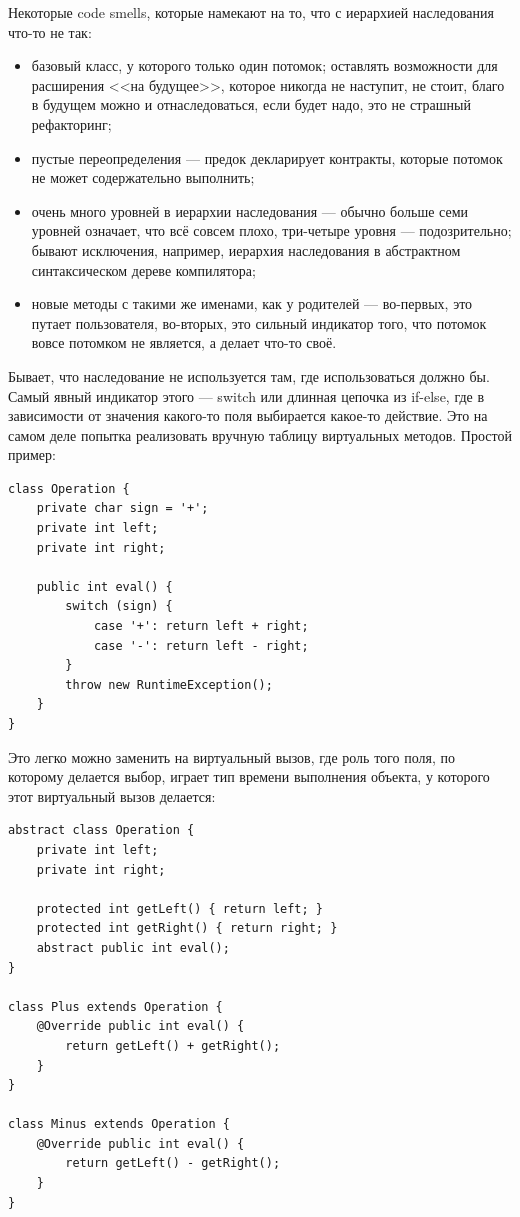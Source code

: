 \documentclass[a5paper]{article}
\begin{document}
Некоторые code smells, которые намекают на то, что с иерархией наследования что-то не так:

\begin{itemize}
    \item базовый класс, у которого только один потомок; оставлять возможности для расширения <<на будущее>>, которое никогда не наступит, не стоит, благо в будущем можно и отнаследоваться, если будет надо, это не страшный рефакторинг;
    \item пустые переопределения --- предок декларирует контракты, которые потомок не может содержательно выполнить;
    \item очень много уровней в иерархии наследования --- обычно больше семи уровней означает, что всё совсем плохо, три-четыре уровня --- подозрительно; бывают исключения, например, иерархия наследования в абстрактном синтаксическом дереве компилятора;
    \item новые методы с такими же именами, как у родителей --- во-первых, это путает пользователя, во-вторых, это сильный индикатор того, что потомок вовсе потомком не является, а делает что-то своё.
\end{itemize}

Бывает, что наследование не используется там, где использоваться должно бы. Самый явный индикатор этого --- switch или длинная цепочка из if-else, где в зависимости от значения какого-то поля выбирается какое-то действие. Это на самом деле попытка реализовать вручную таблицу виртуальных методов. Простой пример:

\begin{verbatim}
class Operation {
    private char sign = '+';
    private int left;
    private int right;

    public int eval() {
        switch (sign) {
            case '+': return left + right;
            case '-': return left - right;
        }
        throw new RuntimeException();
    }
}
\end{verbatim}

Это легко можно заменить на виртуальный вызов, где роль того поля, по которому делается выбор, играет тип времени выполнения объекта, у которого этот виртуальный вызов делается:

\begin{verbatim}
abstract class Operation {
    private int left;
    private int right;

    protected int getLeft() { return left; }
    protected int getRight() { return right; }
    abstract public int eval();
}

class Plus extends Operation {
    @Override public int eval() { 
        return getLeft() + getRight(); 
    }
}

class Minus extends Operation {
    @Override public int eval() { 
        return getLeft() - getRight(); 
    }
}
\end{verbatim}
\end{document}
